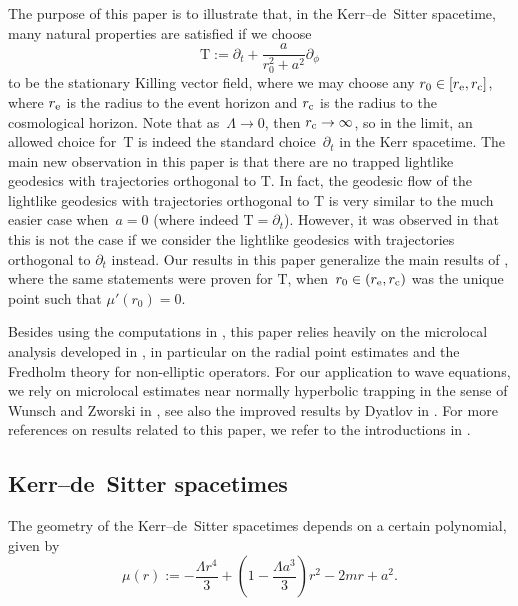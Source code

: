 \documentclass[pdftex]{sigma}
\renewcommand{\d}{\partial}
\newcommand{\T}{\mathrm T}
\numberwithin{equation}{section}
\begin{document}
The purpose of this paper is to illustrate that, in the Kerr--de~Sitter spacetime, many natural properties are satisfied if we choose
\[
	\T
		:= \d_t + \frac a{r_0^2 + a^2}\d_\phi
\]
to be the stationary Killing vector field, where we may choose any $r_0 \in [r_{\rm e}, r_{\rm c}]$,
where $r_{\rm e}$ is the radius to the event horizon and $r_{\rm c}$ is the radius to the cosmological horizon.
Note that as~${\Lambda \to 0}$, then $r_{\rm c} \to \infty$, so in the limit, an allowed choice for~$\T$ is indeed the standard choice~$\d_t$ in the Kerr spacetime.
The main new observation in this paper is that there are no trapped lightlike geodesics with trajectories orthogonal to $\T$.
In fact, the geodesic flow of the lightlike geodesics with trajectories orthogonal to $\T$ is very similar to the much easier case when~${a = 0}$ (where indeed $\T = \d_t$).
However, it was observed in \cite[p.~486]{V2013} that this is not the case if we consider the lightlike geodesics with trajectories orthogonal to $\d_t$ instead.
Our results in this paper generalize the main results of \cite{PV2023}, where the same statements were proven for $\T$, when~${r_0 \in (r_{\rm e}, r_{\rm c})}$ was the unique point such that $\mu'(r_0)= 0$.


Besides using the computations in \cite{PV2023}, this paper relies heavily on the microlocal analysis developed in \cite{V2013}, in particular on the radial point estimates and the Fredholm theory for non-elliptic operators.
For our application to wave equations, we rely on microlocal estimates near normally hyperbolic trapping in the sense of Wunsch and Zworski in \cite{WZ2011}, see also the improved results by Dyatlov in \cite{Dya2015, Dya2015b, Dya2016}.
For more references on results related to this paper, we refer to the introductions in \cite{PV2023,PV2021}.


\subsection{Kerr--de~Sitter spacetimes}
The geometry of the Kerr--de~Sitter spacetimes depends on a certain polynomial, given by
\begin{equation} \label{eq: mu}
	\mu(r)
		:= - \frac{\Lambda r^4}3 + \left( 1 - \frac{\Lambda a^3}3 \right) r^2 - 2mr + a^2.
\end{equation}
\end{document}
